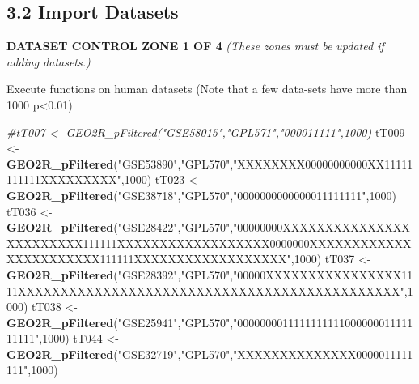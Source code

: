 \documentclass[
]{article}
\newenvironment{Shaded}{\begin{snugshade}}{\end{snugshade}}
\newcommand{\CommentTok}[1]{\textcolor[rgb]{0.56,0.35,0.01}{\textit{#1}}}
\newcommand{\ControlFlowTok}[1]{\textcolor[rgb]{0.13,0.29,0.53}{\textbf{#1}}}
\newcommand{\DecValTok}[1]{\textcolor[rgb]{0.00,0.00,0.81}{#1}}
\newcommand{\FloatTok}[1]{\textcolor[rgb]{0.00,0.00,0.81}{#1}}
\newcommand{\KeywordTok}[1]{\textcolor[rgb]{0.13,0.29,0.53}{\textbf{#1}}}
\newcommand{\NormalTok}[1]{#1}
\newcommand{\OperatorTok}[1]{\textcolor[rgb]{0.81,0.36,0.00}{\textbf{#1}}}
\newcommand{\StringTok}[1]{\textcolor[rgb]{0.31,0.60,0.02}{#1}}
\begin{document}
\begin{Shaded}
\end{Shaded}

\hypertarget{import-datasets}{%
\subsection{3.2 Import Datasets}\label{import-datasets}}

\textbf{DATASET CONTROL ZONE 1 OF 4} \emph{(These zones must be updated
if adding datasets.)}

Execute functions on human datasets (Note that a few data-sets have more
than 1000 p\textless0.01)

\begin{Shaded}
\begin{Highlighting}[]
\CommentTok{#tT007 <- GEO2R_pFiltered("GSE58015","GPL571","000011111",1000)}
\NormalTok{tT009 <-}\StringTok{ }\KeywordTok{GEO2R_pFiltered}\NormalTok{(}\StringTok{"GSE53890"}\NormalTok{,}\StringTok{"GPL570"}\NormalTok{,}\StringTok{"XXXXXXXX00000000000XX11111111111XXXXXXXXX"}\NormalTok{,}\DecValTok{1000}\NormalTok{)}
\NormalTok{tT023 <-}\StringTok{ }\KeywordTok{GEO2R_pFiltered}\NormalTok{(}\StringTok{"GSE38718"}\NormalTok{,}\StringTok{"GPL570"}\NormalTok{,}\StringTok{"0000000000000011111111"}\NormalTok{,}\DecValTok{1000}\NormalTok{)}
\NormalTok{tT036 <-}\StringTok{ }\KeywordTok{GEO2R_pFiltered}\NormalTok{(}\StringTok{"GSE28422"}\NormalTok{,}\StringTok{"GPL570"}\NormalTok{,}\StringTok{"00000000XXXXXXXXXXXXXXXXXXXXXXXX111111XXXXXXXXXXXXXXXXXX0000000XXXXXXXXXXXXXXXXXXXXXXX111111XXXXXXXXXXXXXXXXXX"}\NormalTok{,}\DecValTok{1000}\NormalTok{)}
\NormalTok{tT037 <-}\StringTok{ }\KeywordTok{GEO2R_pFiltered}\NormalTok{(}\StringTok{"GSE28392"}\NormalTok{,}\StringTok{"GPL570"}\NormalTok{,}\StringTok{"00000XXXXXXXXXXXXXXXX1111XXXXXXXXXXXXXXXXXXXXXXXXXXXXXXXXXXXXXXXXXXXXX"}\NormalTok{,}\DecValTok{1000}\NormalTok{)}
\NormalTok{tT038 <-}\StringTok{ }\KeywordTok{GEO2R_pFiltered}\NormalTok{(}\StringTok{"GSE25941"}\NormalTok{,}\StringTok{"GPL570"}\NormalTok{,}\StringTok{"000000001111111111100000001111111111"}\NormalTok{,}\DecValTok{1000}\NormalTok{)}
\NormalTok{tT044 <-}\StringTok{ }\KeywordTok{GEO2R_pFiltered}\NormalTok{(}\StringTok{"GSE32719"}\NormalTok{,}\StringTok{"GPL570"}\NormalTok{,}\StringTok{"XXXXXXXXXXXXXX0000011111111"}\NormalTok{,}\DecValTok{1000}\NormalTok{)}
\end{Highlighting}
\end{Shaded}
\end{document}
